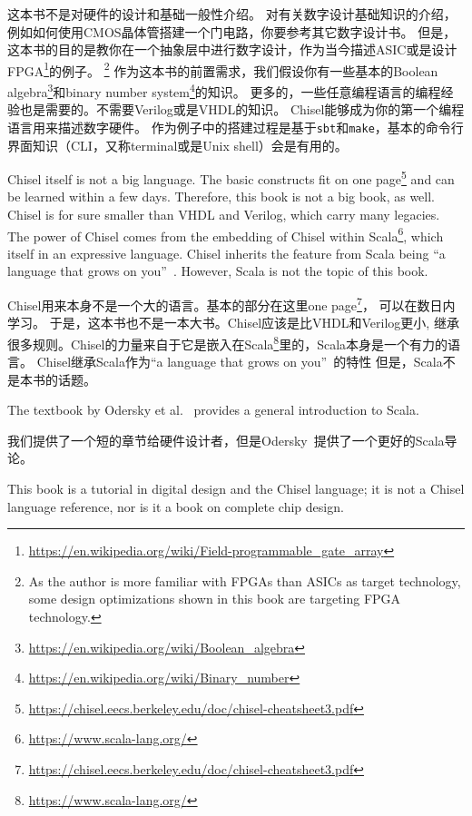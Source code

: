 \documentclass[%
    10pt,
    headinclude, footexclude,
    openright, %
    notitlepage,
    cleardoubleempty,
    headsepline,
    pointlessnumbers,
    bibtotoc, idxtotoc,
    ]{scrbook}
\newcommand{\code}[1]{{\small{\texttt{#1}}}}
\newcommand{\myref}[2]{\href{#1}{#2}}
\renewcommand{\myref}[2]{{#2}{\footnote{\url{#1}}}}
\begin{document}
这本书不是对硬件的设计和基础一般性介绍。
对有关数字设计基础知识的介绍，例如如何使用CMOS晶体管搭建一个门电路，你要参考其它数字设计书。
但是，这本书的目的是教你在一个抽象层中进行数字设计，作为当今描述ASIC或是设计
\myref{https://en.wikipedia.org/wiki/Field-programmable_gate_array}{FPGA}的例子。
\footnote{As the author is more familiar with FPGAs
than ASICs as target technology, some design optimizations shown in this book are
targeting FPGA technology.}
作为这本书的前置需求，我们假设你有一些基本的\myref{https://en.wikipedia.org/wiki/Boolean_algebra}{Boolean algebra}和\myref{https://en.wikipedia.org/wiki/Binary_number}{binary number system}的知识。
更多的，一些任意编程语言的编程经验也是需要的。不需要Verilog或是VHDL的知识。
Chisel能够成为你的第一个编程语言用来描述数字硬件。
作为例子中的搭建过程是基于\code{sbt}和\code{make}，基本的命令行界面知识（CLI，又称terminal或是Unix shell）会是有用的。

Chisel itself is not a big language. The basic constructs fit on
\myref{https://chisel.eecs.berkeley.edu/doc/chisel-cheatsheet3.pdf}{one page}
and can be learned within a few days.
Therefore, this book is not a big book, as well.
Chisel is for sure smaller than VHDL and Verilog, which carry many legacies.
The power of Chisel comes from the embedding of Chisel within
\myref{https://www.scala-lang.org/}{Scala}, which itself in an expressive language.
Chisel inherits the feature from Scala being ``a language that grows on you''~\cite{Scala}.
However, Scala is not the topic of this book.

Chisel用来本身不是一个大的语言。基本的部分在这里\myref{https://chisel.eecs.berkeley.edu/doc/chisel-cheatsheet3.pdf}{one page}， 可以在数日内学习。
于是，这本书也不是一本大书。Chisel应该是比VHDL和Verilog更小, 
继承很多规则。Chisel的力量来自于它是嵌入在\myref{https://www.scala-lang.org/}{Scala}里的，Scala本身是一个有力的语言。
Chisel继承Scala作为``a language that grows on you''~\cite{Scala}的特性
但是，Scala不是本书的话题。

The textbook by Odersky et al.~\cite{Scala} provides a general introduction
to Scala.

我们提供了一个短的章节给硬件设计者，但是Odersky~\cite{Scala}提供了一个更好的Scala导论。

This book is a tutorial in digital design and the Chisel language; it is not
a Chisel language reference, nor is it a book on complete chip design.
\end{document}

